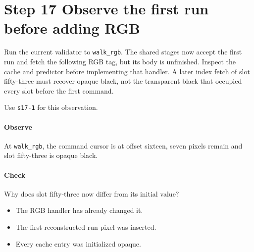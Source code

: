 \section{Step 17 Observe the first run before adding RGB}\label{qoi-s17}
Run the current validator to \texttt{walk\_rgb}. The shared stages now accept the first run and fetch the following RGB tag, but its body is unfinished. Inspect the cache and predictor before implementing that handler. A later index fetch of slot fifty-three must recover opaque black, not the transparent black that occupied every slot before the first command.

Use \texttt{s17-1} for this observation.

\paragraph{Observe} At \texttt{walk\_rgb}, the command cursor is at offset sixteen, seven pixels remain and slot fifty-three is opaque black.

\paragraph{Check} Why does slot fifty-three now differ from its initial value?
\begin{itemize}
  \item[A.] The RGB handler has already changed it.
  \item[B.] The first reconstructed run pixel was inserted.
  \item[C.] Every cache entry was initialized opaque.
\end{itemize}
